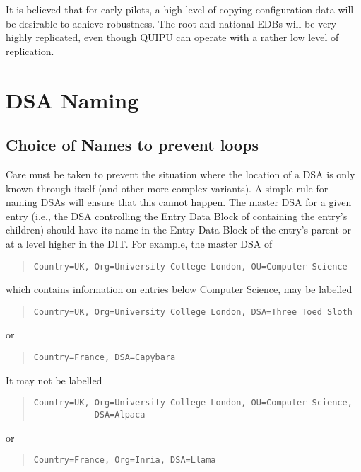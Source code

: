 It is believed that for early pilots, a high level of copying configuration
data will be desirable to achieve robustness.  The root and national EDBs
will be very highly replicated, even though QUIPU can operate with a rather
low level of replication.

\section {DSA Naming}
\label {dsa-naming}

\subsection {Choice of Names to prevent loops}

Care must be taken to prevent the situation where the location
of a DSA is only known through itself (and other more complex
variants).
A simple rule for naming DSAs will ensure that this cannot
happen.
The master DSA for a given entry (i.e., the DSA controlling the Entry Data Block of
containing 
the entry's children) should have its
name in the Entry Data Block of the entry's parent or at a
level higher in the DIT.
For example, the master DSA of 
\begin{quote}\small\begin{verbatim}
Country=UK, Org=University College London, OU=Computer Science
\end{verbatim}\end{quote}
which contains information on entries below Computer Science, may be labelled
\begin{quote}\small\begin{verbatim}
Country=UK, Org=University College London, DSA=Three Toed Sloth
\end{verbatim}\end{quote}
or
\begin{quote}\small\begin{verbatim}
Country=France, DSA=Capybara
\end{verbatim}\end{quote}
It may not be labelled
\begin{quote}\small\begin{verbatim}
Country=UK, Org=University College London, OU=Computer Science, 
            DSA=Alpaca
\end{verbatim}\end{quote}
or
\begin{quote}\small\begin{verbatim}
Country=France, Org=Inria, DSA=Llama
\end{verbatim}\end{quote}


